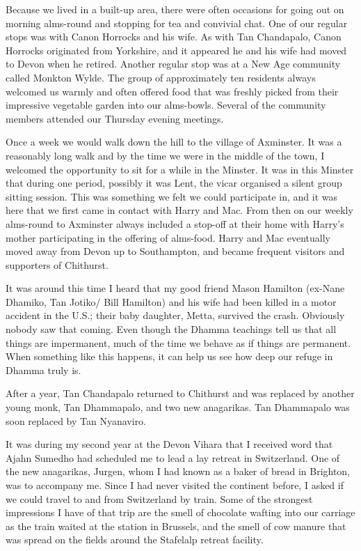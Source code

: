 Because we lived in a built-up area, there were often occasions for
going out on morning alms-round and stopping for tea and convivial chat.
One of our regular stops was with Canon Horrocks and his wife. As with
Tan Chandapalo, Canon Horrocks originated from Yorkshire, and it
appeared he and his wife had moved to Devon when he retired. Another
regular stop was at a New Age community called Monkton Wylde. The group
of approximately ten residents always welcomed us warmly and often
offered food that was freshly picked from their impressive vegetable
garden into our alms-bowls. Several of the community members attended
our Thursday evening meetings.

Once a week we would walk down the hill to the village of Axminster. It
was a reasonably long walk and by the time we were in the middle of the
town, I welcomed the opportunity to sit for a while in the Minster. It
was in this Minster that during one period, possibly it was Lent, the
vicar organised a silent group sitting session. This was something we
felt we could participate in, and it was here that we first came in
contact with Harry and Mac. From then on our weekly alms-round to
Axminster always included a stop-off at their home with Harry's mother
participating in the offering of alms-food. Harry and Mac eventually
moved away from Devon up to Southampton, and became frequent visitors
and supporters of Chithurst.

It was around this time I heard that my good friend Mason Hamilton
(ex-Nane Dhamiko, Tan Jotiko/ Bill Hamilton) and his wife had been
killed in a motor accident in the U.S.; their baby daughter, Metta,
survived the crash. Obviously nobody saw that coming. Even though the
Dhamma teachings tell us that all things are impermanent, much of the
time we behave as if things are permanent. When something like this
happens, it can help us see how deep our refuge in Dhamma truly is.

After a year, Tan Chandapalo returned to Chithurst and was replaced by
another young monk, Tan Dhammapalo, and two new anagarikas. Tan
Dhammapalo was soon replaced by Tan Nyanaviro.

It was during my second year at the Devon Vihara that I received word
that Ajahn Sumedho had scheduled me to lead a lay retreat in
Switzerland. One of the new anagarikas, Jurgen, whom I had known as a
baker of bread in Brighton, was to accompany me. Since I had never
visited the continent before, I asked if we could travel to and from
Switzerland by train. Some of the strongest impressions I have of that
trip are the smell of chocolate wafting into our carriage as the train
waited at the station in Brussels, and the smell of cow manure that was
spread on the fields around the Stafelalp retreat facility.

